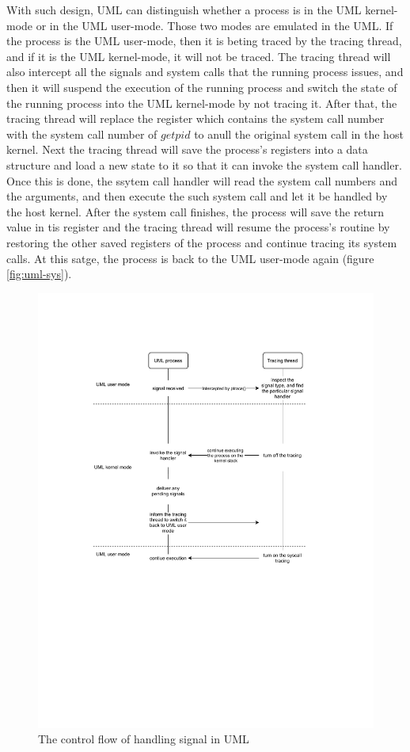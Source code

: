 With such design, UML can distinguish whether a process is in the UML kernel-mode or in the UML user-mode. Those two modes are emulated in the UML. If the process is the UML user-mode, then it is beting traced by the tracing thread, and if it is the UML kernel-mode, it will not be traced. The tracing thread will also intercept all the signals and system calls that the running process issues, and then it will suspend the execution of the running process and switch the state of the running process into the UML kernel-mode by not tracing it. After that, the tracing thread will replace the register which contains the system call number with the system call number of $getpid$ to anull the original system call in the host kernel. Next the tracing thread will save the process's registers into a data structure and load a new state to it so that it can invoke the system call handler. Once this is done, the ssytem call handler will read the system call numbers and the arguments, and then execute the such system call and let it be handled by the host kernel. After the system call finishes, the process will save the return value in tis register and the tracing thread will resume the process's routine by restoring the other saved registers of the process and continue tracing its system calls. At this satge, the process is back to the UML user-mode again (figure \ref{fig:uml-sys}).

\begin{figure}[h]
    \centering
    \includegraphics[clip, trim=0cm 10cm 0cm 3cm, width=1.0\textwidth, height=1.0\textwidth]{ch2/UML-sig.pdf}
    \caption{The control flow of handling signal in UML}
    \label{fig:uml-sig}
\end{figure}

